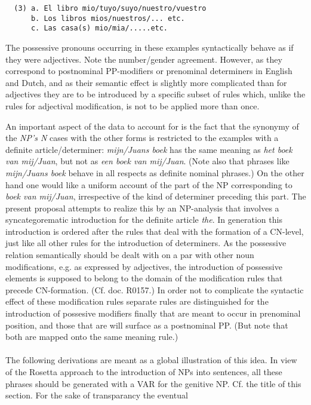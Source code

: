 \begin{verbatim}
  (3) a. El libro mio/tuyo/suyo/nuestro/vuestro
      b. Los libros mios/nuestros/... etc.
      c. Las casa(s) mio/mia/.....etc.
\end{verbatim}

The possessive pronouns occurring in these examples syntactically behave as
if they were adjectives. Note the number/gender agreement. However, as they
correspond to postnominal PP-modifiers or prenominal determiners in English and
Dutch, and as their semantic effect is slightly more complicated than for
adjectives they are to be introduced by a specific subset of rules which,
unlike the rules for adjectival modification, is not to be applied more than
once.

An important aspect of the data to account for is the fact that the synonymy of
the {\em NP's N} cases with the other forms is restricted to the examples with
a definite article/determiner: {\em mijn/Juans boek} has the same meaning as
{\em het boek van mij/Juan}, but not as {\em een boek van mij/Juan}. (Note also
that phrases like {\em mijn/Juans boek} behave in all respects as definite
nominal phrases.) On the other hand one would like a uniform account of the
part of the NP corresponding to {\em boek van mij/Juan}, irrespective of the
kind of determiner preceding this part. The present proposal attempts to
realize this by an NP-analysis that involves a syncategorematic introduction
for the definite article {\em the}. In generation this introduction is ordered
after the rules that deal with the formation of a CN-level, just like all other
rules for the introduction of determiners. As the possessive relation
semantically should be dealt with on a par with other noun modifications, e.g.
as expressed by adjectives, the introduction of possessive elements is supposed
to belong to the domain of the modification rules that precede CN-formation.
(Cf. doc. R0157.) In order not to complicate the syntactic effect of these 
modification rules separate rules are distinguished for the introduction
of possesive modifiers finally that are meant to occur in prenominal 
position, and those that are will surface as a postnominal PP. (But note 
that both are 
mapped  onto the same meaning rule.)
\\ \\
The following derivations are meant as a global illustration of this idea.
In view of the Rosetta approach to the introduction of NPs into
sentences, all these phrases should be generated with a VAR for the genitive NP.
Cf. the title of this section. For the sake of transparancy the eventual

